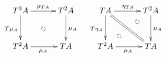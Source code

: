 \documentclass[12pt]{article}
\begin{document}
\pagestyle{empty}

\begin{align*}
  \vcenter{
    \xymatrix@=30pt{
      T^3 A \ar@{->}[d]_{T \mu_A} \ar@{->}[r]^{\mu_{T A}} & T^2 A \ar@{->}[d]^{\mu_A} \\
      T^2 A \ar@{->}[r]_{\mu_A} & T A \ar@{}[lu]|{\circlearrowright}
    }
  }
  \hspace{10pt}
  \vcenter{
    \xymatrix@=30pt{
      T A \ar@{->}[d]_{T \eta_A} \ar@{->}[r]^{\eta_{T A}} \ar@{=}[rd] & T^2 A \ar@{->}[d]^{\mu_A} \\
      T^2 A \ar@{->}[r]_{\mu_A} \ar@{}[ru]|(.3){\circlearrowright} \ar@{}[ru]|(.7){\circlearrowright} & T A
    }
  }
\end{align*}
\end{document}
